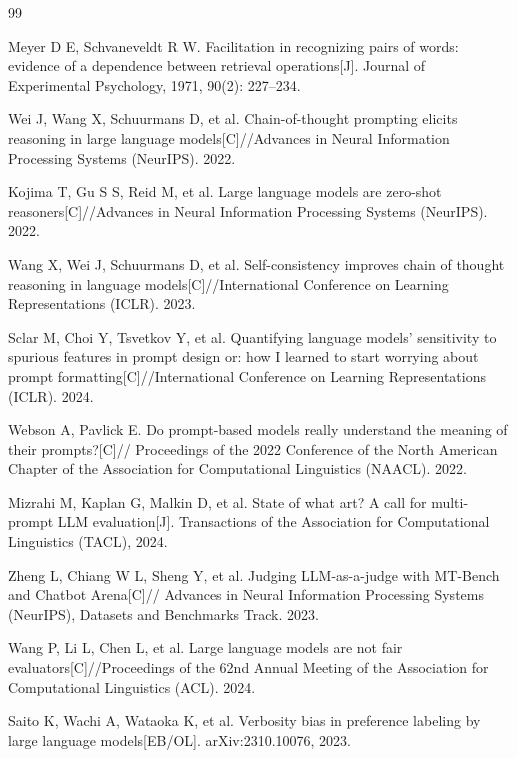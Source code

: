 \documentclass[UTF8,11pt,a4paper]{ctexart}
\begin{document}
\begin{thebibliography}{99}
\footnotesize
\setlength{\itemsep}{1pt}


Meyer D E, Schvaneveldt R W. Facilitation in recognizing pairs of words: evidence of a dependence
between retrieval operations[J]. Journal of Experimental Psychology, 1971, 90(2): 227--234.

Wei J, Wang X, Schuurmans D, et al. Chain-of-thought prompting elicits reasoning in large language
models[C]//Advances in Neural Information Processing Systems (NeurIPS). 2022.

Kojima T, Gu S S, Reid M, et al. Large language models are zero-shot reasoners[C]//Advances in
Neural Information Processing Systems (NeurIPS). 2022.

Wang X, Wei J, Schuurmans D, et al. Self-consistency improves chain of thought reasoning in language
models[C]//International Conference on Learning Representations (ICLR). 2023.

Sclar M, Choi Y, Tsvetkov Y, et al. Quantifying language models' sensitivity to spurious features in
prompt design or: how I learned to start worrying about prompt formatting[C]//International Conference
on Learning Representations (ICLR). 2024.

Webson A, Pavlick E. Do prompt-based models really understand the meaning of their prompts?[C]//
Proceedings of the 2022 Conference of the North American Chapter of the Association for Computational
Linguistics (NAACL). 2022.

Mizrahi M, Kaplan G, Malkin D, et al. State of what art? A call for multi-prompt LLM evaluation[J].
Transactions of the Association for Computational Linguistics (TACL), 2024.

Zheng L, Chiang W L, Sheng Y, et al. Judging LLM-as-a-judge with MT-Bench and Chatbot Arena[C]//
Advances in Neural Information Processing Systems (NeurIPS), Datasets and Benchmarks Track. 2023.

Wang P, Li L, Chen L, et al. Large language models are not fair evaluators[C]//Proceedings of the
62nd Annual Meeting of the Association for Computational Linguistics (ACL). 2024.

Saito K, Wachi A, Wataoka K, et al. Verbosity bias in preference labeling by large language models[EB/OL].
arXiv:2310.10076, 2023.


\end{thebibliography}
\end{document}
